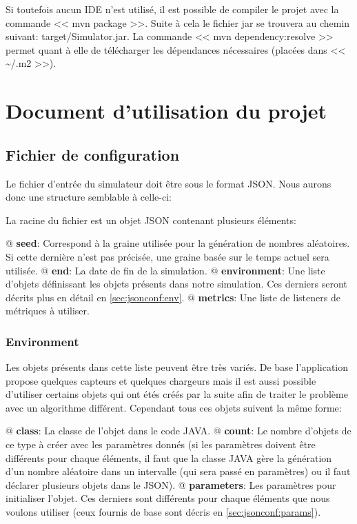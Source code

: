 \documentclass[final]{polytech/polytech}
\begin{document}
		Si toutefois aucun IDE n'est utilisé, il est possible de compiler le projet avec la commande << mvn package >>.
		Suite à cela le fichier jar se trouvera au chemin suivant: target/Simulator.jar.
		La commande << mvn dependency:resolve >> permet quant à elle de télécharger les dépendances nécessaires (placées dans << \textasciitilde/.m2 >>).
 

\chapter{Document d'utilisation du projet}
	\section{Fichier de configuration\label{sec:jsoninput}}
		Le fichier d'entrée du simulateur doit être sous le format JSON.
		Nous aurons donc une structure semblable à celle-ci:
		
		La racine du fichier est un objet JSON contenant plusieurs éléments:
		\begin{easylist}[itemize]
			@ \textbf{seed}: Correspond à la graine utilisée pour la génération de nombres aléatoires. Si cette dernière n'est pas précisée, une graine basée sur le temps actuel sera utilisée.
			@ \textbf{end}: La date de fin de la simulation. 
			@ \textbf{environment}: Une liste d'objets définissant les objets présents dans notre simulation. Ces derniers seront décrits plus en détail en \autoref{sec:jsonconf:env}.
			@ \textbf{metrics}: Une liste de listeners de métriques à utiliser.	
		\end{easylist}
		
		\subsection{Environment\label{sec:jsonconf:env}}
			Les objets présents dans cette liste peuvent être très variés.
			De base l'application propose quelques capteurs et quelques chargeurs mais il est aussi possible d'utiliser certains objets qui ont étés créés par la suite afin de traiter le problème avec un algorithme différent.
			Cependant tous ces objets suivent la même forme:
			\begin{easylist}[itemize]
				@ \textbf{class}: La classe de l'objet dans le code JAVA.
				@ \textbf{count}: Le nombre d'objets de ce type à créer avec les paramètres donnés (si les paramètres doivent être différents pour chaque éléments, il faut que la classe JAVA gère la génération d'un nombre aléatoire dans un intervalle (qui sera passé en paramètres) ou il faut déclarer plusieurs objets dans le JSON).	
				@ \textbf{parameters}: Les paramètres pour initialiser l'objet. Ces derniers sont différents pour chaque éléments que nous voulons utiliser (ceux fournis de base sont décris en \autoref{sec:jsonconf:params}).
			\end{easylist}
\end{document}
